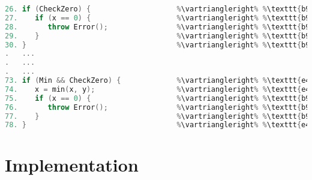 \begin{lstlisting}[language=C++, caption={The above code-snippet illustrates how considering the nesting degree of a structural CFI can add important context to its meaning.\\ We can see that the commit \texttt{b9ea2f3} exclusively implements functionality of the \texttt{CheckZero}-feature. Still, it also structurally interacts with the \texttt{Min}-feature in lines 75-77. The according structural CFI only having a nesting degree of 2, allows us to be less certain of its specifc purpose. At the same time, the structural interaction between \texttt{b9ea2f3} and \texttt{CheckZero} has nesting degree of 1, confirming our believe that the interaction's commit was used to specifically implement the \texttt{CheckZero}-feature.}, label=DescriptiveLabel]	
26. if (CheckZero) {                    %\vartriangleright% %\texttt{b9ea2f3}%    %\vartriangleright% %CheckZero%
27.    if (x == 0) {                    %\vartriangleright% %\texttt{b9ea2f3}%    %\vartriangleright% %CheckZero%
28.       throw Error();                %\vartriangleright% %\texttt{b9ea2f3}%    %\vartriangleright% %CheckZero%
29.    }                                %\vartriangleright% %\texttt{b9ea2f3}%    %\vartriangleright% %CheckZero%
30. }                                   %\vartriangleright% %\texttt{b9ea2f3}%    %\vartriangleright% %CheckZero%
.   ...   
.   ...
.   ...
73. if (Min && CheckZero) {             %\vartriangleright% %\texttt{e49c7a1}%    %\vartriangleright% %Min,CheckZero%
74.    x = min(x, y);                   %\vartriangleright% %\texttt{e49c7a1}%    %\vartriangleright% %Min,CheckZero%
75.    if (x == 0) {                    %\vartriangleright% %\texttt{b9ea2f3}%    %\vartriangleright% %Min,CheckZero%
76.       throw Error();                %\vartriangleright% %\texttt{b9ea2f3}%    %\vartriangleright% %Min,CheckZero%
77.    }                                %\vartriangleright% %\texttt{b9ea2f3}%    %\vartriangleright% %Min,CheckZero%
78. }                                   %\vartriangleright% %\texttt{e49c7a1}%    %\vartriangleright% %Min,CheckZero%
\end{lstlisting}

\section{Implementation}\label{ch:implementation}

